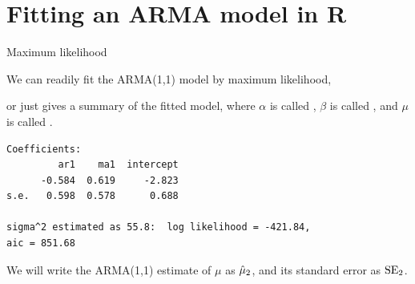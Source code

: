 \section{Fitting an ARMA model in R}

\begin{frame}[fragile]{Maximum likelihood}

We can readily fit the ARMA(1,1) model by maximum likelihood,

\begin{knitrout}\small
{}\color{fgcolor}\begin{kframe}
\begin{alltt}
 \hlkwb{<-} \hlopt{$} \hldef{=}\hldef{(}\hldef{,}\hldef{,}\hldef{))}
\end{alltt}
\end{kframe}
\end{knitrout}

 or just  gives a summary of the fitted model, where $\alpha$ is called , $\beta$ is called , and $\mu$ is called .

\begin{knitrout}\small
{}\color{fgcolor}\begin{kframe}
\begin{verbatim}
Coefficients:
         ar1    ma1  intercept
      -0.584  0.619     -2.823
s.e.   0.598  0.578      0.688

sigma^2 estimated as 55.8:  log likelihood = -421.84,  
aic = 851.68
\end{verbatim}
\end{kframe}
\end{knitrout}

We will write the ARMA(1,1) estimate of $\mu$ as $\hat\mu_2$, and its standard error as $\mathrm{SE}_2$.

\end{frame}

